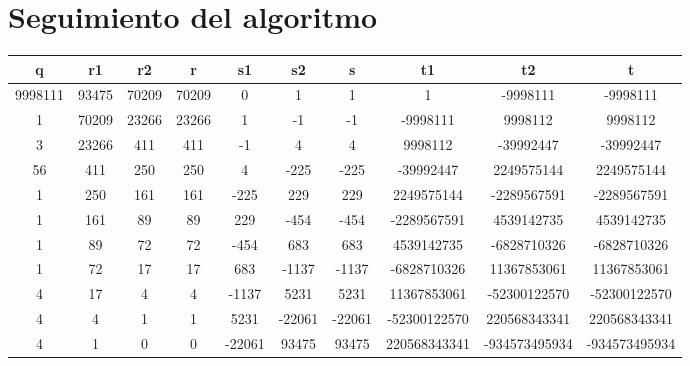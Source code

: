 \section{Seguimiento del algoritmo}
\begin{sideways}
\begin{tabular}{|c|c|c|c|c|c|c|c|c|c|}
\hline
q&r1&r2&r&s1&s2&s&t1&t2&t \\\hline
9998111&93475&70209&70209&0&1&1&1&-9998111&-9998111\\\hline
1&70209&23266&23266&1&-1&-1&-9998111&9998112&9998112\\\hline
3&23266&411&411&-1&4&4&9998112&-39992447&-39992447\\\hline
56&411&250&250&4&-225&-225&-39992447&2249575144&2249575144\\\hline
1&250&161&161&-225&229&229&2249575144&-2289567591&-2289567591\\\hline
1&161&89&89&229&-454&-454&-2289567591&4539142735&4539142735\\\hline
1&89&72&72&-454&683&683&4539142735&-6828710326&-6828710326\\\hline
1&72&17&17&683&-1137&-1137&-6828710326&11367853061&11367853061\\\hline
4&17&4&4&-1137&5231&5231&11367853061&-52300122570&-52300122570\\\hline
4&4&1&1&5231&-22061&-22061&-52300122570&220568343341&220568343341\\\hline
4&1&0&0&-22061&93475&93475&220568343341&-934573495934&-934573495934\\\hline
\end{tabular}
\end{sideways}


%





